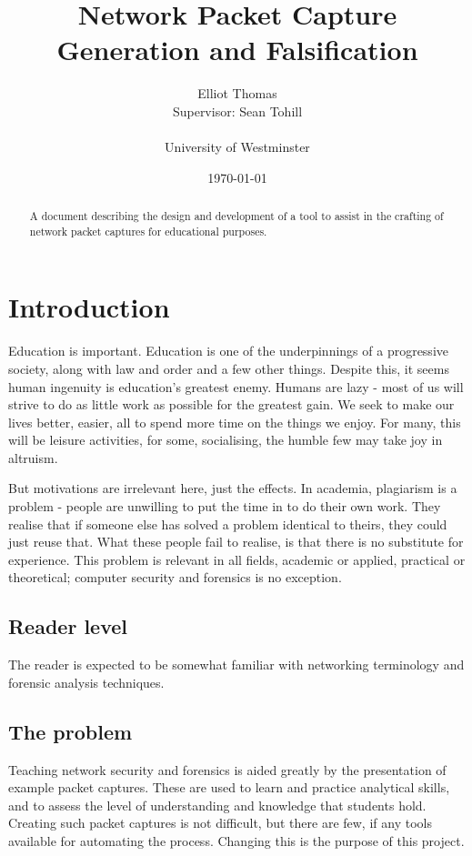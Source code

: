 \documentclass[10pt,a4paper,notitlepage]{report}
\author{Elliot Thomas\\ \small Supervisor: Sean Tohill\\ \\ University of Westminster}
\title{Network Packet Capture Generation and Falsification}
\date{\today}
\begin{document}
\maketitle
\begin{abstract}
\begin{center}
A document describing the design and development of a tool to assist in the crafting of network packet captures for educational purposes.
\end{center}
\end{abstract}
\pagebreak
\tableofcontents

\chapter{Introduction}
Education is important. Education is one of the underpinnings of a progressive society, along with law and order and a few other things.
Despite this, it seems human ingenuity is education's greatest enemy. Humans are lazy - most of us will strive to do as little work as possible for the greatest gain.
We seek to make our lives better, easier, all to spend more time on the things we enjoy. For many, this will be leisure activities, for some, socialising, the humble few may take joy in altruism.

But motivations are irrelevant here, just the effects.
In academia, plagiarism is a problem - people are unwilling to put the time in to do their own work. They realise that if someone else has solved a problem identical to theirs, they could just reuse that.
What these people fail to realise, is that there is no substitute for experience. This problem is relevant in all fields, academic or applied, practical or theoretical; computer security and forensics is no exception.

\section{Reader level}
The reader is expected to be somewhat familiar with networking terminology and forensic analysis techniques.

\section{The problem}
Teaching network security and forensics is aided greatly by the presentation of example packet captures. These are used to learn and practice analytical skills, and to assess the level of understanding and knowledge that students hold.
Creating such packet captures is not difficult, but there are few, if any tools available for automating the process. Changing this is the purpose of this project.
\end{document}
